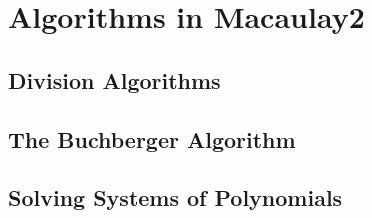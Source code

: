 \clearpage{\thispagestyle{empty}}
\section{Algorithms in Macaulay2}
\label{sec:algorithms-in-macaulay2}



\subsection{Division Algorithms}
\label{ssec:division-algorithms}


\subsection{The Buchberger Algorithm}
\label{sec:buchberger-algorithm}


\subsection{Solving Systems of Polynomials}
\label{ssec:solving-systems-polynomials}
